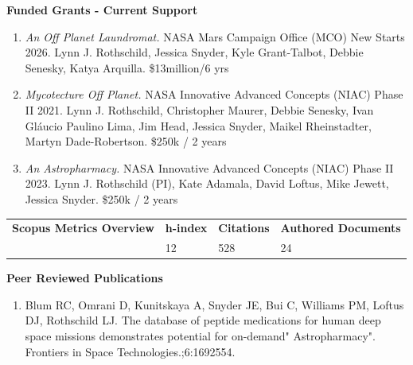 \documentclass[11pt]{article}
\begin{document}
\begin{singlespace}
\begin{flushleft}
\vskip 0.02in \hfill \break

\textbf{Funded Grants - Current Support} \vspace{-1em}
\vskip 0.2in

\begin{enumerate}[ leftmargin=*]
\setlength{\itemsep}{2pt}
 \setlength{\parskip}{0pt}

\item\textit{An Off Planet Laundromat.} NASA Mars Campaign Office (MCO) New Starts 2026. Lynn J. Rothschild, Jessica Snyder, Kyle Grant-Talbot, Debbie Senesky, Katya Arquilla. \$13million/6 yrs

\item\textit{Mycotecture Off Planet.} NASA Innovative Advanced Concepts (NIAC) Phase II 2021. Lynn J. Rothschild,  Christopher Maurer, Debbie Senesky, Ivan Gláucio Paulino Lima, Jim Head, Jessica Snyder, Maikel Rheinstadter, Martyn Dade-Robertson. \$250k / 2 years

\item \textit{An Astropharmacy.} NASA Innovative Advanced Concepts (NIAC) Phase II 2023. Lynn J. Rothschild (PI), Kate Adamala, David Loftus, Mike Jewett, Jessica Snyder. \$250k / 2 years
\end{enumerate}


\begin{longtable}{  p{} p{} p{}  p{} }
\textbf{Scopus Metrics Overview}& \textbf{{h-index}} & \textbf{{Citations}} & \textbf{{Authored Documents}}  \\
 \href{https://www.scopus.com/authid/detail.uri?authorId=56007982800}{\color{linkcolor}{https://www.scopus.com/56007982800}}
& 12 & 528 & 24 \\
\end{longtable}

\vskip 0.1in

\textbf{Peer Reviewed Publications} \vspace{-1em}
\vskip 0.2in

\begin{enumerate} [ leftmargin=*]
\setlength{\leftmargin}{0pt}
\setlength{\itemsep}{2pt}
 \setlength{\parskip}{0pt}

\item Blum RC, Omrani D, Kunitskaya A, Snyder JE, Bui C, Williams PM, Loftus DJ, Rothschild LJ. The database of peptide medications for human deep space missions demonstrates potential for on-demand" Astropharmacy". Frontiers in Space Technologies.;6:1692554. \href{https://doi.org/10.3389/frspt.2025.1692554}{\color{linkcolor}{https://doi.org/10.3389/frspt.2025.1692554}}


\end{enumerate}
\end{flushleft}
\end{singlespace}
\end{document}
